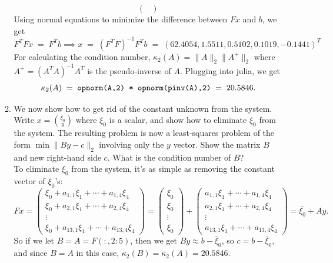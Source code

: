 \documentclass[11pt]{article}
\newcommand{\n}{\vspace{0.3cm}}
\begin{document}
\begin{enumerate}
\begin{enumerate}
\[\begin{pmatrix}
			            \end{pmatrix}
		            \]
		            Using normal equations to minimize the difference between \(Fx\) and \(b\), we get
		            \[F^T Fx \;=\; F^T b \implies x \;=\; (F^T F)^{-1} F^T b \;=\; (62.4054, 1.5511, 0.5102, 0.1019, -0.1441)^T\]
		            For calculating the condition number, \(\kappa_2(A) = \lVert A \rVert_2 \lVert A^+ \rVert_2\) where \(A^+ = (A^T A)^{-1} A^T\) is the pseudo-inverse of \(A\).  Plugging into julia, we get
		            \[\kappa_2(A) \;=\; \verb$opnorm(A,2) * opnorm(pinv(A),2)$ \;=\; 20.5846.\]

		      \item We now show how to get rid of the constant unknown from the system.  Write \(x = \binom{\xi_0}{y}\) where \(\xi_0\) is a scalar, and show how to eliminate \(\xi_0\) from the system.  The resulting problem is now a least-squares problem of the form \(\min \lVert By-c \rVert_2\) involving only the \(y\) vector.  Show the matrix \(B\) and new right-hand side \(c\).  What is the condition number of \(B\)? \n\\
		            To eliminate \(\xi_0\) from the system, it's as simple as removing the constant vector of \(\xi_0\)'s:
		            \[Fx =
			            \begin{pmatrix}
				            \xi_0 + a_{1,1}\xi_1 + \cdots + a_{1,4}\xi_4 \\
				            \xi_0 + a_{2,1}\xi_1 + \cdots + a_{2,4}\xi_4 \\
				            \vdots                                       \\
				            \xi_0 + a_{13,1}\xi_1 + \cdots + a_{13,4}\xi_4
			            \end{pmatrix}
			            =
			            \begin{pmatrix} \xi_0 \\ \xi_0 \\ \vdots \\ \xi_0 \end{pmatrix} +
			            \begin{pmatrix}
				            a_{1,1}\xi_1 + \cdots + a_{1,4}\xi_4 \\
				            a_{2,1}\xi_1 + \cdots + a_{2,4}\xi_4 \\
				            \vdots                               \\
				            a_{13,1}\xi_1 + \cdots + a_{13,4}\xi_4
			            \end{pmatrix}
			            = \bar{\xi_0} + Ay.
		            \]
		            So if we let \(B = A = F(:,2:5)\), then we get \(By \approx b - \bar\xi_0\), so \(c = b - \bar\xi_0\), and since \(B = A\) in this case, \(\kappa_2(B) = \kappa_2(A) = 20.5846\). \n


\end{enumerate}
\end{enumerate}
\end{document}
